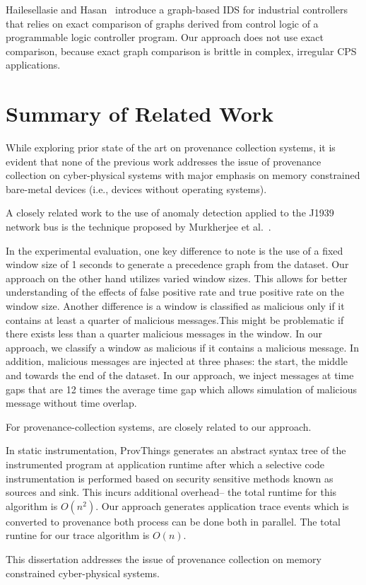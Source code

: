 Hailesellasie and Hasan~\cite{hailesellasie_intrusion_2018} introduce a graph-based IDS for industrial controllers that relies on exact comparison of graphs derived from control logic of a programmable logic controller program. Our approach does not use exact comparison, because exact graph comparison is brittle in complex, irregular CPS applications.



\section{Summary of Related Work}

While exploring prior state of the art on provenance collection systems, it is evident that none of the previous work addresses the issue of provenance collection on cyber-physical systems with major emphasis on memory constrained bare-metal devices (i.e., devices without operating systems). 

A closely related work to the use of anomaly detection applied to the J1939 network bus is the technique proposed by Murkherjee et al.~\cite{Mukherjee2017APG}.

In the experimental evaluation, one key difference to note is the use of a fixed window size of 1 seconds to generate a precedence graph from the dataset. Our approach on the other hand utilizes varied window sizes. This allows for better understanding of the effects of false positive rate and true positive rate on the window size. Another difference is a window is classified as malicious only if it contains at least a quarter of malicious messages.This might be problematic if there exists less than a quarter malicious messages in the window. In our approach, we classify a window as malicious if it contains a malicious message. In addition, malicious messages are injected at three phases: the start, the middle and towards the end of the dataset. In our approach, we inject messages at time gaps that are 12 times the average time gap which allows simulation of malicious message without time overlap. 


For provenance-collection systems, \cite{jia2017contexiot, Wang2017FearAL, tariq_towards_2012} are closely related to our approach.

In static instrumentation, ProvThings generates an abstract syntax tree of the instrumented program at application runtime after which a selective code instrumentation is performed based on security sensitive methods known as sources and sink. This incurs additional overhead-- the total runtime for this algorithm is $O(n^2)$. Our approach generates application trace events which is converted to provenance both process can be done both in parallel. The total runtine for our trace algorithm is $O(n)$.







This dissertation addresses the issue of provenance collection on memory constrained cyber-physical systems.













